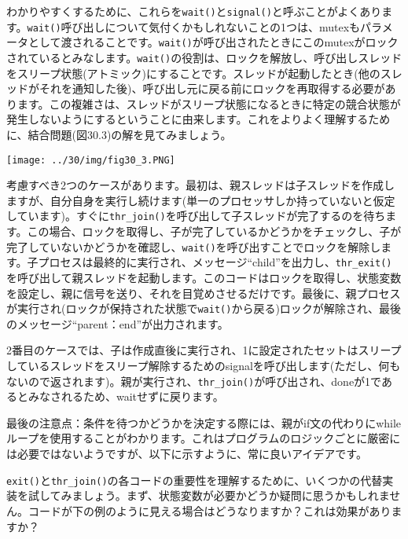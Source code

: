 \begin{Shaded}
\begin{Highlighting}[]
\end{Highlighting}
\end{Shaded}

わかりやすくするために、これらを\texttt{wait()}と\texttt{signal()}と呼ぶことがよくあります。\texttt{wait()}呼び出しについて気付くかもしれないことの1つは、mutexもパラメータとして渡されることです。\texttt{wait()}が呼び出されたときにこのmutexがロックされているとみなします。\texttt{wait()}の役割は、ロックを解放し、呼び出しスレッドをスリープ状態(アトミック)にすることです。スレッドが起動したとき(他のスレッドがそれを通知した後)、呼び出し元に戻る前にロックを再取得する必要があります。この複雑さは、スレッドがスリープ状態になるときに特定の競合状態が発生しないようにするということに由来します。これをよりよく理解するために、結合問題(図30.3)の解を見てみましょう。

\texttt{[image: ../30/img/fig30\_3.PNG]}

考慮すべき2つのケースがあります。最初は、親スレッドは子スレッドを作成しますが、自分自身を実行し続けます(単一のプロセッサしか持っていないと仮定しています)。すぐに\texttt{thr\_join()}を呼び出して子スレッドが完了するのを待ちます。この場合、ロックを取得し、子が完了しているかどうかをチェックし、子が完了していないかどうかを確認し、\texttt{wait()}を呼び出すことでロックを解除します。子プロセスは最終的に実行され、メッセージ``child''を出力し、\texttt{thr\_exit()}を呼び出して親スレッドを起動します。このコードはロックを取得し、状態変数を設定し、親に信号を送り、それを目覚めさせるだけです。最後に、親プロセスが実行され(ロックが保持された状態で\texttt{wait()}から戻る)ロックが解除され、最後のメッセージ``parent：end''が出力されます。

2番目のケースでは、子は作成直後に実行され、1に設定されたセットはスリープしているスレッドをスリープ解除するためのsignalを呼び出します(ただし、何もないので返されます)。親が実行され、\texttt{thr\_join()}が呼び出され、doneが1であるとみなされるため、waitせずに戻ります。

最後の注意点：条件を待つかどうかを決定する際には、親がif文の代わりにwhileループを使用することがわかります。これはプログラムのロジックごとに厳密には必要ではないようですが、以下に示すように、常に良いアイデアです。

\texttt{exit()}と\texttt{thr\_join()}の各コードの重要性を理解するために、いくつかの代替実装を試してみましょう。まず、状態変数が必要かどうか疑問に思うかもしれません。コードが下の例のように見える場合はどうなりますか？これは効果がありますか？

